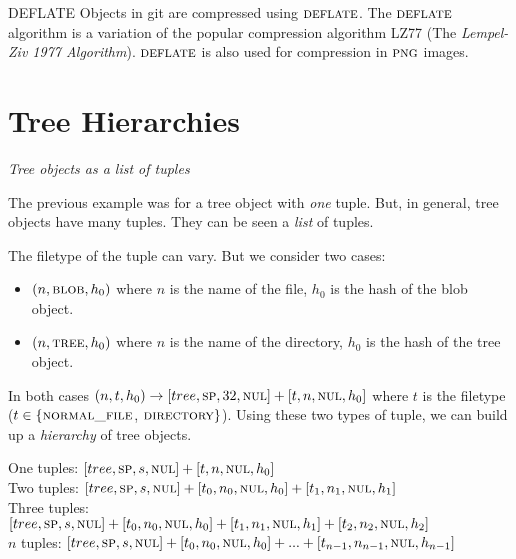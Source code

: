 \frmrule 


\begin{sidenote}{DEFLATE}
Objects in git are 
compressed using $\textsc{deflate}$. The $\textsc{deflate}$ algorithm is a 
variation of the popular compression algorithm LZ77 
(The \textit{Lempel-Ziv 1977 Algorithm}).  $\textsc{deflate}$ is also used 
for compression in $\textsc{png}$ images.
\end{sidenote}

\section{Tree Hierarchies}

\frmrule 

\textit{Tree objects as a list of tuples}

The previous example was for a tree object with \textit{one} tuple.
But, in general, tree objects have many tuples. They can be seen a \textit{list} of tuples.


The filetype of the tuple can vary. But we consider two cases:
\begin{itemize}
\item
$(n,\textsc{blob},h_0)$  where $n$ 
is the name of the file, $h_0$ is the hash of the blob object.
\item
$(n,\textsc{tree},h_0)$ where $n$ 
is the name of the directory, $h_0$ is the hash of the tree object.
\end{itemize}

In both cases $(n,t,h_0) \rightarrow [tree,\textsc{sp},32,\textsc{nul}] + [t,n,\textsc{nul},h_0]$
where $t$ is the filetype ($t \in \{\textsc{normal\textunderscore file}$, $\textsc{directory}\}$). 
Using these two types of tuple, we can build up a \textit{hierarchy} of tree objects. 

One tuples: $[tree,\textsc{sp},s,\textsc{nul}] + [t,n,\textsc{nul},h_0]$\\
Two tuples: $[tree,\textsc{sp},s,\textsc{nul}] + [t_0,n_0,\textsc{nul},h_0] + [t_1,n_1,\textsc{nul},h_1]$\\
Three tuples: $[tree,\textsc{sp},s,\textsc{nul}] + [t_0,n_0,\textsc{nul},h_0] + [t_1,n_1,\textsc{nul},h_1] + [t_2,n_2,\textsc{nul},h_2]$\\
$n$ tuples: $[tree,\textsc{sp},s,\textsc{nul}] +  [t_0,n_0,\textsc{nul},h_0] + ... + [t_{n-1},n_{n-1},\textsc{nul},h_{n-1}]$

